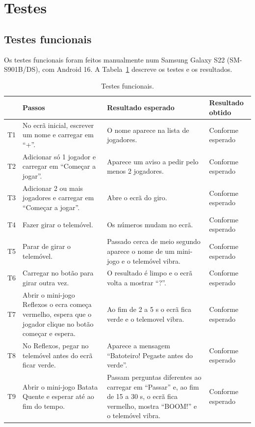 \documentclass[runningheads,a4paper]{llncs}
\begin{document}
\section{Testes}
\subsection{Testes funcionais}
Os testes funcionais foram feitos manualmente num Samsung Galaxy S22
(SM-S901B/DS), com Android 16. A Tabela~\ref{tab:testes} descreve os testes
e os resultados.

\begin{table}[H]

\caption{Testes funcionais.}
\label{tab:testes}
\centering
\footnotesize
\begin{tabular}{|p{0.7cm}|p{3.6cm}|p{3.4cm}|p{2.4cm}|}
\hline
 & Passos & Resultado esperado & Resultado obtido \\ \hline
T1 & No ecrã inicial, escrever um nome e carregar em ``+''. & O nome aparece
na lista de jogadores. & Conforme esperado \\ \hline
T2 & Adicionar só 1 jogador e carregar em ``Começar a jogar''. & Aparece um
aviso a pedir pelo menos 2 jogadores. & Conforme esperado \\ \hline
T3 & Adicionar 2 ou mais jogadores e carregar em ``Começar a jogar''. & Abre
o ecrã do giro. & Conforme esperado \\ \hline
T4 & Fazer girar o telemóvel. & Os números mudam no ecrã. & Conforme esperado \\
\hline
T5 & Parar de girar o telemóvel. & Passado cerca de meio segundo aparece o
nome de um mini-jogo e o telemóvel vibra. & Conforme esperado \\ \hline
T6 & Carregar no botão para girar outra vez. & O resultado é limpo e o ecrã
volta a mostrar ``?''. & Conforme esperado \\ \hline
T7 & Abrir o mini-jogo Reflexos o ecra começa vermelho, espera que o jogador clique no botão começar e espera. & Ao fim de 2 a 5 s o ecrã fica verde e o telemovel vibra. &
Conforme esperado \\ \hline
T8 & No Reflexos, pegar no telemóvel antes do ecrã ficar verde. & Aparece a
mensagem ``Batoteiro! Pegaste antes do verde''. & Conforme esperado \\ \hline
T9 & Abrir o mini-jogo Batata Quente e esperar até ao fim do tempo. & Passam
perguntas diferentes ao carregar em ``Passar'' e, ao fim de 15 a 30 s, o
ecrã fica vermelho, mostra ``BOOM!'' e o telemóvel vibra. & Conforme esperado \\

\end{tabular}
\end{table}
\end{document}
